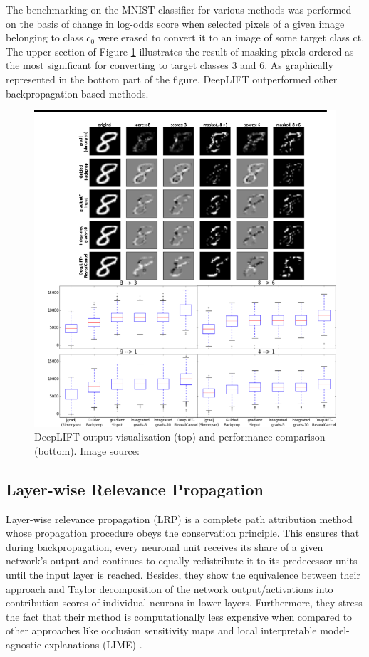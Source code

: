\documentclass[../report.tex]{subfiles}
\begin{document}
The benchmarking on the MNIST classifier for various methods was performed on the basis of change in log-odds score when selected pixels of a given image belonging to class $c_0$ were erased to convert it to an image of some target class ct. The upper section of Figure \ref{fig_deep_lift2} illustrates the result of masking pixels ordered as the most significant for converting to target classes 3 and 6. As graphically represented in the bottom part of the figure, DeepLIFT outperformed other backpropagation-based methods.

 \begin{figure}[H]
 	\centering
	\includegraphics[scale=0.5, trim=0cm 0cm 0cm 1cm, clip]{images/chapter3/deep_lift_2.png}
	\caption[DeepLIFT output visualization and performance comparison]{DeepLIFT output visualization (top) and performance comparison (bottom). Image source: \cite{shrikumar2017learning}}
	\label{fig_deep_lift2}
\end{figure}


\subsection{Layer-wise Relevance Propagation}
\noindent
Layer-wise relevance propagation (LRP) \cite{lrp} is a complete path attribution method whose propagation procedure obeys the conservation principle. This ensures that during backpropagation, every neuronal unit receives its share of a given network’s output and continues to equally redistribute it to its predecessor units until the input layer is reached. Besides, they show the equivalence between their approach and Taylor decomposition of the network output/activations into contribution scores of individual neurons in lower layers. Furthermore, they stress the fact that their method is computationally less expensive when compared to other approaches like occlusion sensitivity maps and local interpretable model-agnostic explanations (LIME) \cite{lime}.
\end{document}
